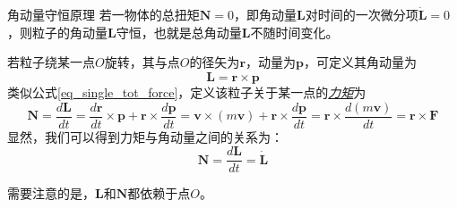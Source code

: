 \vspace{5pt}
\begin{theorem}{角动量守恒原理}
	若一物体的总扭矩$\bm{N}=0$，即角动量$\bm{L}$对时间的一次微分项$\dot{\bm{L}} = 0$，则粒子的角动量$\bm{L}$守恒，也就是总角动量$\bm{L}$不随时间变化。
\end{theorem}
若粒子绕某一点$O$旋转，其与点$O$的径矢为$\bm{r}$，动量为$\bm{p}$，可定义其角动量为
\begin{equation}
	\bm{L} = \bm{r} \times \bm{p}	\label{eq_angular_momentum}
\end{equation}
类似公式\eqref{eq_single_tot_force}，定义该粒子关于某一点的\underline{\textit{力矩}}为
\begin{equation}
	\bm{N} = \frac{d\bm{L}}{dt} = \frac{d \bm{r}}{dt} \times \bm{p} + \bm{r} \times \frac{d\bm{p}}{dt} = \bm{v} \times (m\bm{v}) + \bm{r} \times \frac{d\bm{p}}{dt} = \bm{r} \times \frac{d(m\bm{v})}{dt} = \bm{r} \times \bm{F}
\end{equation}
显然，我们可以得到力矩与角动量之间的关系为：
\begin{equation}
	\bm{N} = \frac{d\bm{L}}{dt} = \dot{\bm{L}}
\end{equation}
\begin{note}
	需要注意的是，$\bm{L}$和$\bm{N}$都依赖于点$O$。
\end{note}


